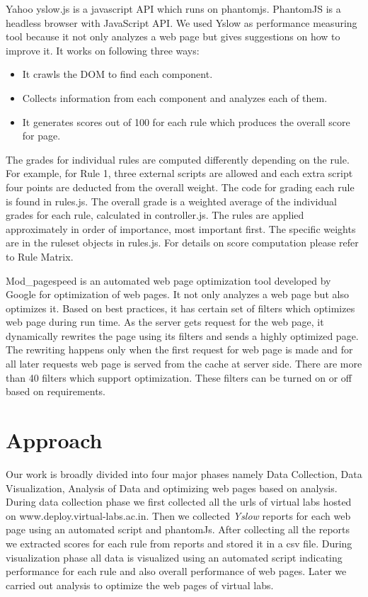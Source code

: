 \documentclass[conference]{IEEEtran}
\begin{document}
Yahoo yslow.js is a javascript API which runs on phantomjs. PhantomJS is a
headless browser with JavaScript API\cite{pjs}. We used Yslow as performance measuring
tool because it not only analyzes a web page but gives suggestions on how to
improve it. It works on following three ways:
\begin{itemize}
\item It crawls the DOM to find each component.
\item Collects information from each component and analyzes each of them.
\item It generates scores out of 100 for each rule which produces the overall
score for page.
\end{itemize}
The grades for individual rules are computed differently depending on the rule.
For example, for Rule 1, three external scripts are allowed and each extra script
four points are deducted from the overall weight. The code for grading each
rule is found in rules.js. The overall grade is a weighted average of the
individual grades for each rule, calculated in controller.js. The rules are applied
approximately in order of importance, most important first. The specific weights
are in the ruleset objects in rules.js. For details on score computation please refer to Rule Matrix\cite{rulematrix}.

Mod\_pagespeed\cite{google:mod-pagespeed} is an automated web page optimization tool developed by Google for
optimization of web pages. It not only
analyzes a web page but also optimizes it. Based on best practices, it has
certain set of filters which optimizes web page during run time. As the server
gets request for the web page, it dynamically rewrites the page using its filters\cite{pagespeed:filters}
and sends a highly optimized page. The rewriting happens only when the first
request for web page is made and for all later requests web page is served from the cache
at server side. There are more than 40 filters which support
optimization. These filters can be turned on or off based on requirements. 
% 
% 
\section{Approach}\label{sec-4}
Our work is broadly divided into four major phases namely Data Collection, Data
Visualization, Analysis of Data and optimizing web pages based on analysis.
During data collection phase we first collected all the urls of virtual labs
hosted on www.deploy.virtual-labs.ac.in. Then we collected {\it Yslow} reports for each web page
using an automated script and phantomJs. After collecting all the reports we
extracted scores for each rule from reports and stored it in a csv file. During
visualization phase all data is visualized using an automated script indicating
performance for each rule and also overall performance of web pages. Later we
carried out analysis to optimize the web pages of virtual labs.
\end{document}
